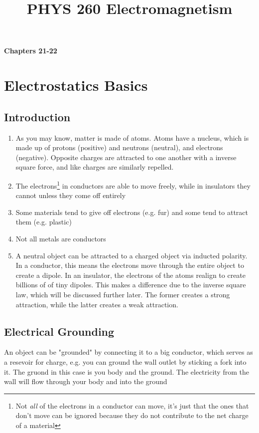 \documentclass[10pt, a4paper, twocolumn]{article}
\title{PHYS 260 Electromagnetism}
\author{\authorstyle{Miles Kent}}
\date{}
\begin{document}
\graphicspath{ {./images/} }

\maketitle

\textbf{\huge Chapters 21-22}
    \section{Electrostatics Basics}    
        \subsection{Introduction}
            \begin{enumerate}
                \item {
                    As you may know, matter is made of atoms.
                    Atoms have a nucleus, which is made up of protons (positive) and neutrons (neutral), and electrons (negative).
                    Opposite charges are attracted to one another with a inverse square force, and like charges are similarly repelled.
                }
                \item {
                    The electrons\footnote{Not \textit{all} of the electrons in a conductor can move, it's just that the ones that don't move can be ignored because they do not contribute to the net charge of a material} in conductors are able to move freely, while in insulators they cannot unless they come off entirely
                }
                \item {
                    Some materials tend to give off electrons (e.g. fur) and some tend to attract them (e.g. plastic)   
                }
                \item {
                    Not all metals are conductors
                }
                \item {
                    A neutral object can be attracted to a charged object via inducted polarity. In a conductor, this means the electrons move through the entire object to create a dipole. In an insulator, the electrons of the atoms realign to create billions of of tiny dipoles. This makes a difference due to the inverse square law, which will be discussed further later. The former creates a strong attraction, while the latter creates a weak attraction.
                }
            \end{enumerate}
        \subsection{Electrical Grounding}
            An object can be "grounded" by connecting it to a big conductor, which serves as a resevoir for charge, e.g. you can ground the wall outlet by sticking a fork into it. The gruond in this case is you body and the ground. The electricity from the wall will flow through your body and into the ground
\end{document}

